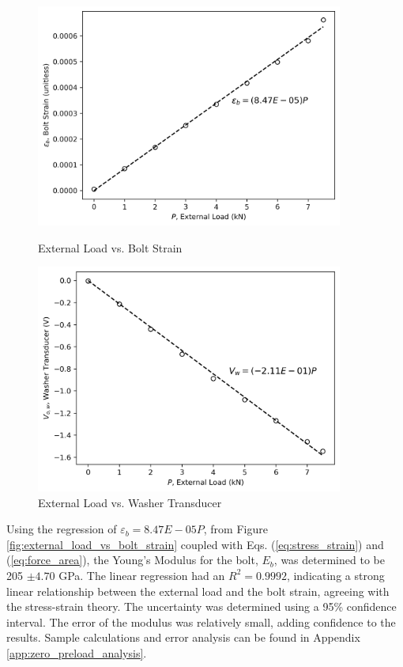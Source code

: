 \begin{figure}[h]
    \centering
    \begin{minipage}{0.50\textwidth}
        \centering
        \includegraphics[width=0.9\textwidth]{Sections/Figures/external_load_vs_bolt_strain.png}
        \caption{External Load vs. Bolt Strain}
        \label{fig:external_load_vs_bolt_strain}
    \end{minipage}\hfill
    \begin{minipage}{0.50\textwidth}
        \centering
        \includegraphics[width=0.9\textwidth]{Sections/Figures/external_load_vs_washer_transducer.png}
        \caption{External Load vs. Washer Transducer}
        \label{fig:external_load_vs_washer_transducer}
    \end{minipage}
\end{figure}

Using the regression of $\varepsilon_{b} = 8.47E-05 P$, from Figure \ref{fig:external_load_vs_bolt_strain} coupled with Eqs. (\ref{eq:stress_strain}) and (\ref{eq:force_area}), the Young's Modulus for the bolt, $E_b$, was determined to be 205 $\pm 4.70$ GPa. The linear regression had an $R^2 =  0.9992$, indicating a strong linear relationship between the external load and the bolt strain, agreeing with the stress-strain theory. The uncertainty was determined using a 95\% confidence interval. The error of the modulus was relatively small, adding confidence to the results. Sample calculations and error analysis can be found in Appendix \ref{app:zero_preload_analysis}.

